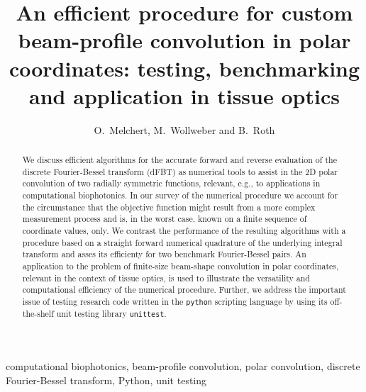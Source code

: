 \documentclass[12pt]{iopart}
\begin{document}

\title[dFBT: testing, benchmarking, and application in biophotonics]
{An efficient procedure for custom beam-profile convolution in polar coordinates: 
testing, benchmarking and application in tissue optics}

\author{O.\ Melchert, M.\ Wollweber and B.\ Roth}

\address{Hannover Centre for Optical Technologies (HOT), 
Leibniz Universit\"at Hannover, 
Nienburger Str.\,17, 
D-30167 Hannover, Germany}


\begin{abstract}
We discuss efficient algorithms for the accurate forward and reverse evaluation
of the discrete Fourier-Bessel transform (dFBT) as numerical tools to assist in
the $2$D polar convolution of two radially symmetric functions, relevant, e.g.,
to applications in computational biophotonics.
  In our survey of the numerical procedure we account for the circumstance
that the objective function might result from a more complex measurement
process and is, in the worst case, known on a finite sequence of 
coordinate values, only.
  We contrast the performance of the resulting algorithms with a procedure
based on a straight forward numerical quadrature of the underlying integral
transform and asses its efficienty for two benchmark Fourier-Bessel pairs. 
  An application to the problem of finite-size beam-shape convolution in polar
coordinates, relevant in the context of tissue optics, is used to illustrate
the versatility and computational efficiency of the numerical procedure.
  Further, we address the important issue of testing research code written in
the {\tt{python}} scripting language by using its off-the-shelf unit testing
library {\tt{unittest}}.
\end{abstract}


 computational biophotonics, beam-profile convolution,
polar convolution, discrete Fourier-Bessel transform, Python, unit testing


\end{document}
